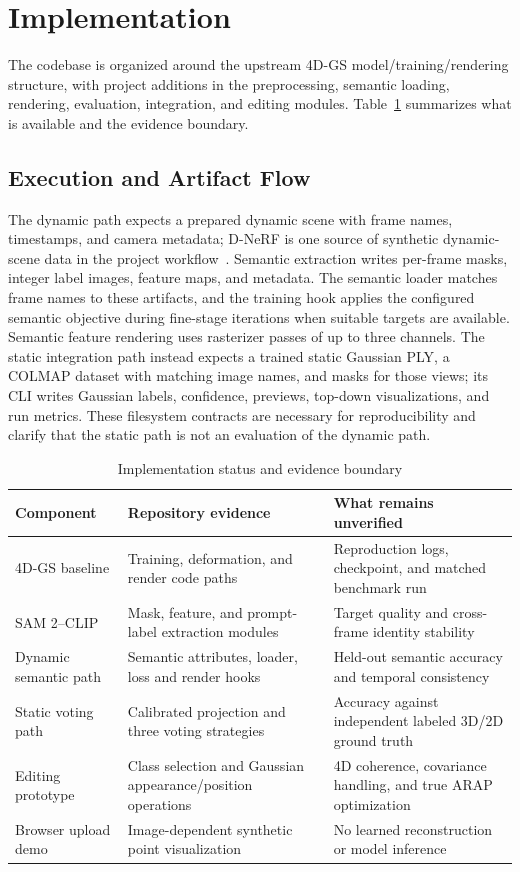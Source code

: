 \documentclass[conference]{IEEEtran}
\begin{document}
\section{Implementation}
The codebase is organized around the upstream 4D-GS model/training/rendering structure, with project additions in the preprocessing, semantic loading, rendering, evaluation, integration, and editing modules. Table~\ref{tab:status} summarizes what is available and the evidence boundary.

\subsection{Execution and Artifact Flow}
The dynamic path expects a prepared dynamic scene with frame names, timestamps, and camera metadata; D-NeRF is one source of synthetic dynamic-scene data in the project workflow~\cite{pumarolaDNeRF2021}. Semantic extraction writes per-frame masks, integer label images, feature maps, and metadata. The semantic loader matches frame names to these artifacts, and the training hook applies the configured semantic objective during fine-stage iterations when suitable targets are available. Semantic feature rendering uses rasterizer passes of up to three channels. The static integration path instead expects a trained static Gaussian PLY, a COLMAP dataset with matching image names, and masks for those views; its CLI writes Gaussian labels, confidence, previews, top-down visualizations, and run metrics. These filesystem contracts are necessary for reproducibility and clarify that the static path is not an evaluation of the dynamic path.

\begin{table}[t]
\caption{Implementation status and evidence boundary}
\label{tab:status}
\centering
\footnotesize
\begin{tabular}{p{}p{}p{}}
\toprule
Component & Repository evidence & What remains unverified \\
\midrule
4D-GS baseline & Training, deformation, and render code paths & Reproduction logs, checkpoint, and matched benchmark run \\
SAM 2--CLIP & Mask, feature, and prompt-label extraction modules & Target quality and cross-frame identity stability \\
Dynamic semantic path & Semantic attributes, loader, loss and render hooks & Held-out semantic accuracy and temporal consistency \\
Static voting path & Calibrated projection and three voting strategies & Accuracy against independent labeled 3D/2D ground truth \\
Editing prototype & Class selection and Gaussian appearance/position operations & 4D coherence, covariance handling, and true ARAP optimization \\
Browser upload demo & Image-dependent synthetic point visualization & No learned reconstruction or model inference \\
\bottomrule
\end{tabular}
\end{table}
\end{document}

